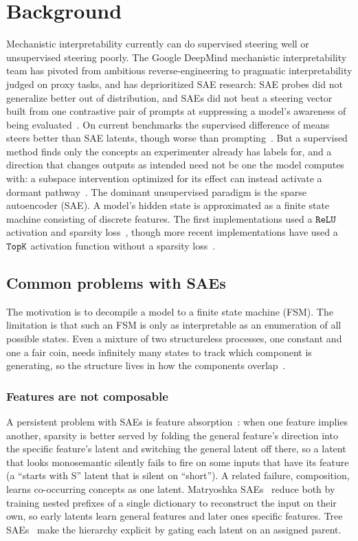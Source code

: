 \section{Background}
Mechanistic interpretability currently can do supervised steering well
or unsupervised steering poorly. The Google DeepMind mechanistic
interpretability team has pivoted from ambitious reverse-engineering to
pragmatic interpretability judged on proxy tasks, and has deprioritized
SAE research: SAE probes did not generalize better out of distribution,
and SAEs did not beat a steering vector built from one contrastive pair
of prompts at suppressing a model's awareness of being
evaluated~\cite{gdmprogress2025}. On current benchmarks the supervised
difference of means steers better than SAE latents, though worse than
prompting~\cite{wu2025axbenchsteeringllmssimple}. But a supervised
method finds only the concepts an experimenter already has labels for,
and a direction that changes outputs as intended need not be one the
model computes with: a subspace intervention optimized for its effect
can instead activate a dormant pathway~\cite{makelov2023}. The dominant
unsupervised paradigm is the sparse autoencoder (SAE). A model's hidden
state is approximated as a finite state machine consisting of discrete
features. The first implementations used a $\mathop{\mathtt{ReLU}}\limits$ activation and
sparsity loss~\cite{cunningham2023,bricken2023}, though more recent
implementations have used a $\mathop{\mathtt{TopK}}\limits$ activation function without a
sparsity loss~\cite{gao2024}.

\subsection{Common problems with SAEs}
The motivation is to decompile a model to a finite state machine (FSM).
The limitation is that such an FSM is only as interpretable as an
enumeration of all possible states. Even a mixture of two structureless
processes, one constant and one a fair coin, needs infinitely many
states to track which component is generating, so the structure lives
in how the components overlap~\cite{crutchfield2026}.

\subsubsection{Features are not composable}
A persistent problem with SAEs is feature absorption~\cite{chanin2025}:
when one feature implies another, sparsity is better served by folding
the general feature's direction into the specific feature's latent and
switching the general latent off there, so a latent that looks
monosemantic silently fails to fire on some inputs that have its feature
(a ``starts with S'' latent that is silent on ``short''). A related
failure, composition, learns co-occurring concepts as one latent.
Matryoshka SAEs~\cite{bussmann2025} reduce both by training nested
prefixes of a single dictionary to reconstruct the input on their own,
so early latents learn general features and later ones specific
features. Tree SAEs~\cite{cao2026} make the hierarchy explicit by gating
each latent on an assigned parent.

